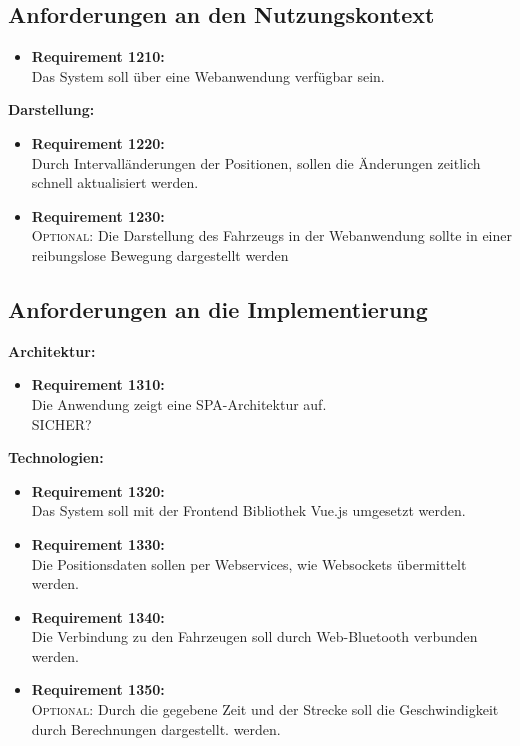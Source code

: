 \subsection{Anforderungen an den Nutzungskontext}
\begin{itemize}
\item \textbf{Requirement 1210:}\\
Das System soll \"uber eine Webanwendung verf\"ugbar sein.
\end{itemize}
\textbf{Darstellung:}
\begin{itemize}
\item \textbf{Requirement 1220:}\\
Durch Intervall\"anderungen der Positionen, sollen die \"Anderungen zeitlich schnell aktualisiert werden.
\item \textbf{Requirement 1230:}\\
\textsc{Optional:} Die Darstellung des Fahrzeugs in der Webanwendung sollte in einer reibungslose Bewegung dargestellt werden
\end{itemize}
\subsection{Anforderungen an die Implementierung}
\textbf{Architektur:}
\begin{itemize}
\item \textbf{Requirement 1310:}\\
Die Anwendung zeigt eine \ac{SPA}-Architektur auf.\\ SICHER?
\end{itemize}
\textbf{Technologien:}
\begin{itemize}
\item \textbf{Requirement 1320:}\\
Das System soll mit der Frontend Bibliothek Vue.js umgesetzt werden.
\item \textbf{Requirement 1330:}\\
Die Positionsdaten sollen per Webservices, wie Websockets \"ubermittelt werden.
\item \textbf{Requirement 1340:}\\
Die Verbindung zu den Fahrzeugen soll durch Web-Bluetooth verbunden werden.
\item \textbf{Requirement 1350:}\\
\textsc{Optional:} Durch die gegebene Zeit und der Strecke soll die Geschwindigkeit durch Berechnungen dargestellt.
 werden.
\end{itemize}